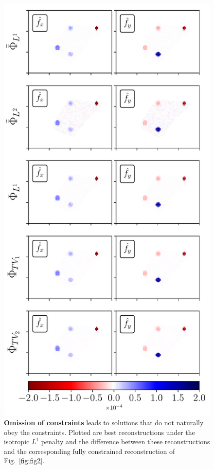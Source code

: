 \documentclass[aps,prl,reprint,twocolumn,groupedaddress,showpacs]{revtex4}
\begin{document}
\begin{figure}
\includegraphics[width=\linewidth]{fig3}
\caption{\textbf{Omission of constraints} leads to solutions that do
  not naturally obey the constraints. Plotted are best reconstructions
  under the isotropic $L^1$ penalty and the difference between these
  reconstructions and the corresponding fully constrained
  reconstruction of Fig.~\ref{fig:fig2}. }
\label{fig:fig3}
\end{figure}
\end{document}
